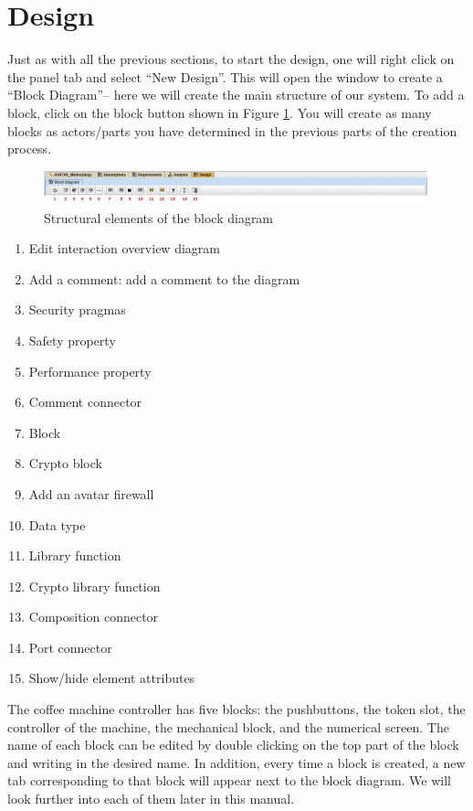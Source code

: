\documentclass[12pt]{article}
\begin{document}
\section{Design}
	Just as with all the previous sections, to start the design, one will right click on the panel tab and select “New Design”. This will open the window to create a “Block Diagram”-- here we will create the main structure of our system. To add a block, click on the block button shown in Figure \ref{fig:blockdiagram}. You will create as many blocks as actors/parts you have determined in the previous parts of the creation process. 


\begin{figure}[htbp]
\centering
\includegraphics[width=0.99\textwidth]{fig/blockdiagram.jpg}
\caption{Structural elements of the block diagram} \label{fig:blockdiagram}
\end{figure}


\begin{enumerate}
\item Edit interaction overview diagram
\item Add a comment: add a comment to the diagram
\item Security pragmas
\item Safety property
\item Performance property
\item Comment connector
\item Block
\item Crypto block
\item Add an avatar firewall
\item Data type 
\item Library function
\item Crypto library function
\item Composition connector
\item Port connector
\item Show/hide element attributes

\end{enumerate}

The coffee machine controller has five blocks: the pushbuttons, the token slot, the controller of the machine, the mechanical block, and the numerical screen. The name of each block can be edited by double clicking on the top part of the block and writing in the desired name. In addition, every time a block is created, a new tab corresponding to that block will appear next to the block diagram. We will look further into each of them later in this manual.
\end{document}
